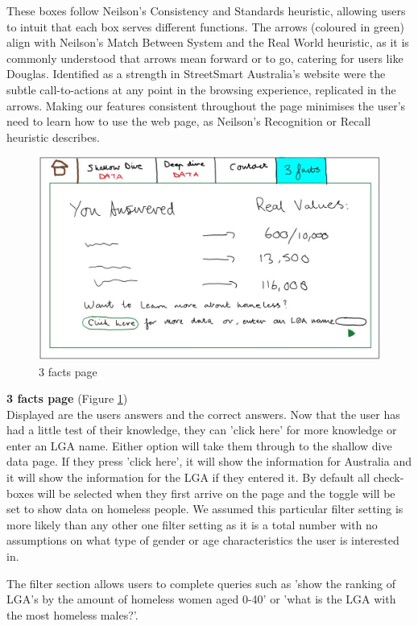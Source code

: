 \documentclass[12pt, a4paper]{article}
\begin{document}
These boxes follow Neilson’s Consistency and Standards heuristic, allowing users to intuit that each box serves different functions. The arrows (coloured in green) align with Neilson’s Match Between System and the Real World heuristic, as it is commonly understood that arrows mean forward or to go, catering for users like Douglas. Identified as a strength in StreetSmart Australia’s website were the subtle call-to-actions at any point in the browsing experience, replicated in the arrows. Making our features consistent throughout the page minimises the user’s need to learn how to use the web page, as Neilson’s Recognition or Recall heuristic describes.\\
\begin{figure}[h]
\centering
\includegraphics[scale=.6]{3facts.jpg} 
\caption{3 facts page}
\label{fig:facts}
\end{figure}
\textbf{3 facts page} (Figure \ref{fig:facts})\\
Displayed are the users answers and the correct answers. Now that the user has had a little test of their knowledge, they can 'click here' for more knowledge or enter an LGA name. Either option will take them through to the shallow dive data page. If they press 'click here', it will show the information for Australia and it will show the information for the LGA if they entered it. By default all check-boxes will be selected when they first arrive on the page and the toggle will be set to show data on homeless people. We assumed this particular filter setting is more likely than any other one filter setting as it is a total number with no assumptions on what type of gender or age characteristics the user is interested in. 

The filter section allows users to complete queries such as 'show the ranking of LGA's by the amount of homeless women aged 0-40' or 'what is the LGA with the most homeless males?'.
\end{document}
